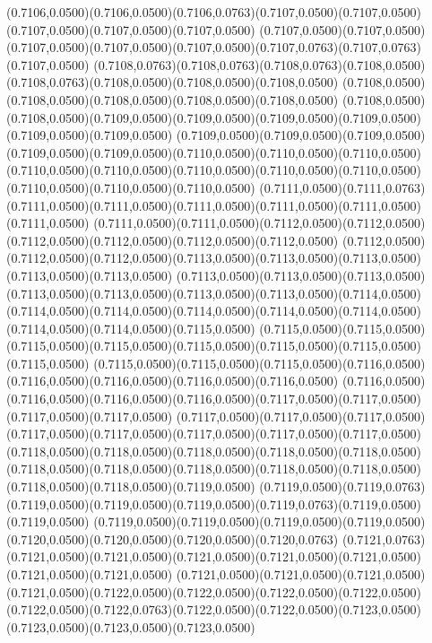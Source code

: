 (0.7106,0.0500)(0.7106,0.0500)(0.7106,0.0763)(0.7107,0.0500)(0.7107,0.0500)(0.7107,0.0500)(0.7107,0.0500)(0.7107,0.0500)
(0.7107,0.0500)(0.7107,0.0500)(0.7107,0.0500)(0.7107,0.0500)(0.7107,0.0500)(0.7107,0.0763)(0.7107,0.0763)(0.7107,0.0500)
(0.7108,0.0763)(0.7108,0.0763)(0.7108,0.0763)(0.7108,0.0500)(0.7108,0.0763)(0.7108,0.0500)(0.7108,0.0500)(0.7108,0.0500)
(0.7108,0.0500)(0.7108,0.0500)(0.7108,0.0500)(0.7108,0.0500)(0.7108,0.0500)
\PST@Solid(0.7108,0.0500)(0.7108,0.0500)(0.7109,0.0500)(0.7109,0.0500)(0.7109,0.0500)(0.7109,0.0500)(0.7109,0.0500)(0.7109,0.0500)
(0.7109,0.0500)(0.7109,0.0500)(0.7109,0.0500)(0.7109,0.0500)(0.7109,0.0500)(0.7110,0.0500)(0.7110,0.0500)(0.7110,0.0500)
(0.7110,0.0500)(0.7110,0.0500)(0.7110,0.0500)(0.7110,0.0500)(0.7110,0.0500)(0.7110,0.0500)(0.7110,0.0500)(0.7110,0.0500)
(0.7111,0.0500)(0.7111,0.0763)(0.7111,0.0500)(0.7111,0.0500)(0.7111,0.0500)(0.7111,0.0500)(0.7111,0.0500)(0.7111,0.0500)
(0.7111,0.0500)(0.7111,0.0500)(0.7112,0.0500)(0.7112,0.0500)(0.7112,0.0500)(0.7112,0.0500)(0.7112,0.0500)(0.7112,0.0500)
(0.7112,0.0500)(0.7112,0.0500)(0.7112,0.0500)(0.7113,0.0500)(0.7113,0.0500)(0.7113,0.0500)(0.7113,0.0500)(0.7113,0.0500)
(0.7113,0.0500)(0.7113,0.0500)(0.7113,0.0500)(0.7113,0.0500)(0.7113,0.0500)(0.7113,0.0500)(0.7113,0.0500)(0.7114,0.0500)
(0.7114,0.0500)(0.7114,0.0500)(0.7114,0.0500)(0.7114,0.0500)(0.7114,0.0500)(0.7114,0.0500)(0.7114,0.0500)(0.7115,0.0500)
(0.7115,0.0500)(0.7115,0.0500)(0.7115,0.0500)(0.7115,0.0500)(0.7115,0.0500)(0.7115,0.0500)(0.7115,0.0500)(0.7115,0.0500)
(0.7115,0.0500)(0.7115,0.0500)(0.7115,0.0500)(0.7116,0.0500)(0.7116,0.0500)(0.7116,0.0500)(0.7116,0.0500)(0.7116,0.0500)
(0.7116,0.0500)(0.7116,0.0500)(0.7116,0.0500)(0.7116,0.0500)(0.7117,0.0500)(0.7117,0.0500)(0.7117,0.0500)(0.7117,0.0500)
(0.7117,0.0500)(0.7117,0.0500)(0.7117,0.0500)(0.7117,0.0500)(0.7117,0.0500)(0.7117,0.0500)(0.7117,0.0500)(0.7117,0.0500)
(0.7118,0.0500)(0.7118,0.0500)(0.7118,0.0500)(0.7118,0.0500)(0.7118,0.0500)
\PST@Solid(0.7118,0.0500)(0.7118,0.0500)(0.7118,0.0500)(0.7118,0.0500)(0.7118,0.0500)(0.7118,0.0500)(0.7118,0.0500)(0.7119,0.0500)
(0.7119,0.0500)(0.7119,0.0763)(0.7119,0.0500)(0.7119,0.0500)(0.7119,0.0500)(0.7119,0.0763)(0.7119,0.0500)(0.7119,0.0500)
(0.7119,0.0500)(0.7119,0.0500)(0.7119,0.0500)(0.7119,0.0500)(0.7120,0.0500)(0.7120,0.0500)(0.7120,0.0500)(0.7120,0.0763)
(0.7121,0.0763)(0.7121,0.0500)(0.7121,0.0500)(0.7121,0.0500)(0.7121,0.0500)(0.7121,0.0500)(0.7121,0.0500)(0.7121,0.0500)
(0.7121,0.0500)(0.7121,0.0500)(0.7121,0.0500)(0.7121,0.0500)(0.7122,0.0500)(0.7122,0.0500)(0.7122,0.0500)(0.7122,0.0500)
(0.7122,0.0500)(0.7122,0.0763)(0.7122,0.0500)(0.7122,0.0500)(0.7123,0.0500)(0.7123,0.0500)(0.7123,0.0500)(0.7123,0.0500)
